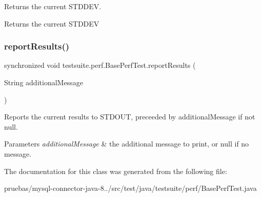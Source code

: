 Returns the current S\+T\+D\+D\+EV.

\begin{DoxyReturn}{Returns}
the current S\+T\+D\+D\+EV 
\end{DoxyReturn}
\mbox{\label{classtestsuite_1_1perf_1_1_base_perf_test_a88bddb3492e88ede49a0b70c63dc47b1}} 
\subsubsection{\texorpdfstring{report\+Results()}{reportResults()}}
{\footnotesize\ttfamily synchronized void testsuite.\+perf.\+Base\+Perf\+Test.\+report\+Results (\begin{DoxyParamCaption}\item[{String}]{additional\+Message }\end{DoxyParamCaption})\hspace{0.3cm}{\ttfamily [protected]}}

Reports the current results to S\+T\+D\+O\+UT, preceeded by {\ttfamily additional\+Message} if not null.


\begin{DoxyParams}{Parameters}
{\em additional\+Message} & the additional message to print, or null if no message. \\
\hline
\end{DoxyParams}


The documentation for this class was generated from the following file\+:\begin{DoxyCompactItemize}
\item 
pruebas/mysql-\/connector-\/java-\/8../src/test/java/testsuite/perf/Base\+Perf\+Test.\+java\end{DoxyCompactItemize}

